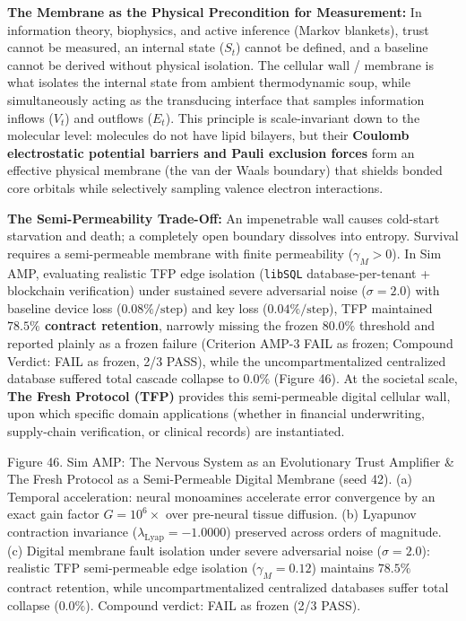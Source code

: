 \documentclass[
]{article}
\begin{document}
\textbf{The Membrane as the Physical Precondition for Measurement:} In
information theory, biophysics, and active inference (Markov blankets),
trust cannot be measured, an internal state (\(S_t\)) cannot be defined,
and a baseline cannot be derived without physical isolation. The
cellular wall / membrane is what isolates the internal state from
ambient thermodynamic soup, while simultaneously acting as the
transducing interface that samples information inflows (\(V_t\)) and
outflows (\(E_t\)). This principle is scale-invariant down to the
molecular level: molecules do not have lipid bilayers, but their
\textbf{Coulomb electrostatic potential barriers and Pauli exclusion
forces} form an effective physical membrane (the van der Waals boundary)
that shields bonded core orbitals while selectively sampling valence
electron interactions.

\textbf{The Semi-Permeability Trade-Off:} An impenetrable wall causes
cold-start starvation and death; a completely open boundary dissolves
into entropy. Survival requires a semi-permeable membrane with finite
permeability (\(\gamma_M > 0\)). In Sim AMP, evaluating realistic TFP
edge isolation (\texttt{libSQL} database-per-tenant + blockchain
verification) under sustained severe adversarial noise
(\(\sigma = 2.0\)) with baseline device loss (\(0.08\%/\text{step}\))
and key loss (\(0.04\%/\text{step}\)), TFP maintained \textbf{\(78.5\%\)
contract retention}, narrowly missing the frozen \(80.0\%\) threshold
and reported plainly as a frozen failure (Criterion AMP-3 FAIL as
frozen; Compound Verdict: FAIL as frozen, 2/3 PASS), while the
uncompartmentalized centralized database suffered total cascade collapse
to \textbf{\(0.0\%\)} (Figure 46). At the societal scale, \textbf{The
Fresh Protocol (TFP)} provides this semi-permeable digital cellular
wall, upon which specific domain applications (whether in financial
underwriting, supply-chain verification, or clinical records) are
instantiated.

Figure 46. Sim AMP: The Nervous System as an Evolutionary Trust
Amplifier \& The Fresh Protocol as a Semi-Permeable Digital Membrane
(seed 42). (a) Temporal acceleration: neural monoamines accelerate error
convergence by an exact gain factor \(G = 10^6\times\) over pre-neural
tissue diffusion. (b) Lyapunov contraction invariance
(\(\lambda_{\text{Lyap}} = -1.0000\)) preserved across orders of
magnitude. (c) Digital membrane fault isolation under severe adversarial
noise (\(\sigma = 2.0\)): realistic TFP semi-permeable edge isolation
(\(\gamma_M = 0.12\)) maintains \(78.5\%\) contract retention, while
uncompartmentalized centralized databases suffer total collapse
(\(0.0\%\)). Compound verdict: FAIL as frozen (2/3 PASS).
\end{document}
